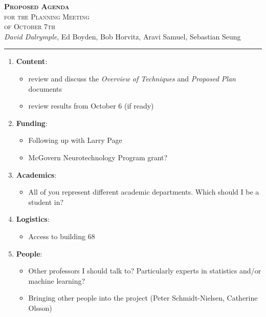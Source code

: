\documentclass[letter,12pt]{article}
\begin{document}
\thispagestyle{empty}
\begin{center}
  \textsc{\Large \textbf{Proposed Agenda} \\[0.5mm] for the Planning Meeting \\[2.8mm] of October 7th}\\[2.6mm]
	\textit{David Dalrymple}, Ed Boyden, Bob Horvitz, Aravi Samuel, Sebastian Seung\\[1.7mm]
	\rule[2mm]{0.76\textwidth}{0.25mm}
\end{center}
\vspace{0.64cm}
\begin{enumerate}
  \item \textbf{Content}:
    \begin{itemize}
      \item review and discuss the \textit{Overview of Techniques} and \textit{Proposed Plan} documents
      \item review results from October 6 (if ready)
    \end{itemize}
\item \textbf{Funding}: 
	\begin{itemize}
		\item Following up with Larry Page
		\item McGovern Neurotechnology Program grant?
	\end{itemize}
\item \textbf{Academics}:
	\begin{itemize}
		\item All of you represent different academic departments. Which should I be a student in?
	\end{itemize}
\item \textbf{Logistics}:
	\begin{itemize} 
		\item Access to building 68
	\end{itemize}
\item \textbf{People}:
  \begin{itemize}
    \item Other professors I should talk to? Particularly experts in statistics and/or machine learning?
    \item Bringing other people into the project (Peter Schmidt-Nielsen, Catherine Olsson)
	\end{itemize}
\end{enumerate}
\end{document}
